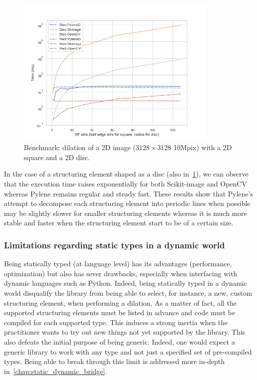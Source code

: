 \begin{figure}[htb]
  \centering
  \includegraphics[width=3.8in]{../figures/bench_disc_rect_by_SE}
  \caption{Benchmark: dilation of a 2D image (\(3128 \times 3128\) \eqmark 10Mpix) with a 2D square and a 2D disc.}
  \label{fig:gen.bench.square.disc}
\end{figure}



In the case of a structuring element shaped as a disc (also in~\cref{fig:gen.bench.square.disc}), we can observe that
the execution time raises exponentially for both Scikit-image and OpenCV whereas Pylene remains regular and steady fast.
These results show that Pylene's attempt to decompose each structuring element into periodic lines when possible may be
slightly slower for smaller structuring elements whereas it is much more stable and faster when the structuring element
start to be of a certain size.

\subsubsection{Limitations regarding static types in a dynamic world}

Being statically typed (at language level) has its advantages (performance, optimization) but also has sever drawbacks,
especially when interfacing with dynamic languages such as Python. Indeed, being statically typed in a dynamic world
disqualify the library from being able to select, for instance, a new, custom structuring element, when performing a
dilation. As a matter of fact, all the supported structuring elements must be listed in advance and code must be
compiled for each supported type. This induces a strong inertia when the practitioner wants to try out new things not
yet supported by the library. This also defeats the initial purpose of being generic. Indeed, one would expect a generic
library to work with any type and not just a specified set of pre-compiled types. Being able to break through this limit
is addressed more in-depth in~\cref{chap:static_dynamic_bridge}.


